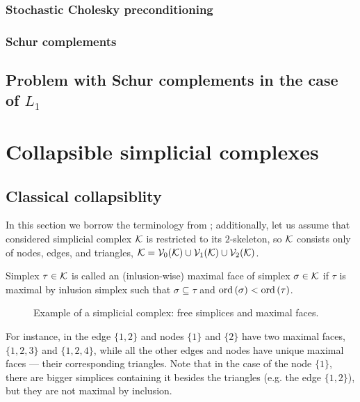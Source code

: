 \subsubsection{ Stochastic Cholesky preconditioning  }
      
\subsubsection{ Schur complements }


\subsection{ Problem with Schur complements in the case of \( L_1 \)  }

      




\section{Collapsible simplicial complexes}


\subsection{ Classical collapsiblity }


In this section we borrow the terminology from \cite{whiteheadSimplicialSpacesNuclei1939}; additionally, let us  assume that considered simplicial complex \( \mathcal{K} \) is restricted to its \(2\)-skeleton, so \( \mathcal{K} \) consists only of nodes, edges, and triangles, \( \mathcal{K} = \mathcal{V}_{0}(\mathcal{K}) \cup \mathcal{V}_{1}(\mathcal{K}) \cup \mathcal{V}_{2}(\mathcal{K})\).

Simplex \( \tau \in \mathcal{K} \) is called an (inlusion-wise) {maximal face} of simplex \( \sigma \in \mathcal{K} \) if \( \tau \) is maximal by inlusion simplex such that \( \sigma \subseteq \tau \) and \( \mathrm{ord}\,(\sigma) < \mathrm{ord}\,(\tau) \). 
\begin{figure}[hbtp]
      \centering
      
      \caption{Example of a simplicial complex: free simplices and maximal faces. \label{fig:adjacent_triangles}}
\end{figure}
 For instance, in  the edge \( \{1, 2\} \) and nodes \( \{ 1 \} \) and \( \{ 2 \} \) have two maximal faces, \( \{ 1, 2, 3 \} \) and \( \{ 1, 2, 4 \} \), while all the other edges and nodes have unique maximal faces --- their corresponding triangles. Note that in the case of the node \( \{ 1 \} \), there are bigger simplices containing it besides the triangles (e.g. the edge \( \{ 1, 2 \} \)), but they are not maximal by inclusion.

